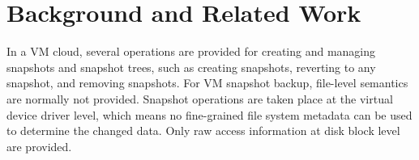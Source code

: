 
\section{Background and Related Work}
\label{sect:background}

In a VM cloud, several operations are provided for creating and managing snapshots and snapshot trees,
such as creating snapshots, reverting to any snapshot, and removing snapshots.
For VM snapshot backup, file-level semantics are normally not provided. 
Snapshot operations are taken place at the virtual device driver level, which means no fine-grained file system metadata can be used to determine the changed data. Only raw access information at disk block level are provided.




